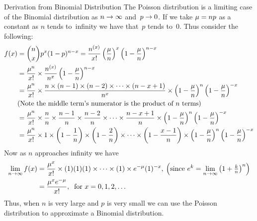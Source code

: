 \begin{theory}{Derivation from Binomial Distribution}
The Poisson distribution is a limiting case of the Binomial distribution as $n \rightarrow \infty$ and~$p \rightarrow 0$. If we take $\mu = np$ as a constant as $n$ tends to~infinity we have that~$p$ tends to~0. Thus consider the following:
\begin{align*}
    f(x) &= \binom{n}{x} p^x (1-p)^{n-x} 
          = \frac{n^{(x)}}{x!} \left(\frac{\mu}{n}\right)^x \left(1-\frac{\mu}{n}\right)^{n-x} \\
         &= \frac{\mu^n}{x!} \times \frac{n^{(x)}}{n^x} \left(1-\frac{\mu}{n}\right)^{n-x} \\
         &= \frac{\mu^n}{x!} \times \frac{n \times (n-1) \times (n-2) \times \cdots \times (n-x+1)}{n^x} \times \left(1-\frac{\mu}{n}\right)^{n}\left(1-\frac{\mu}{n}\right)^{-x} \\
         &\text{(Note the middle term's numerator is the product of $n$ terms)} \\
         &= \frac{\mu^n}{x!} \times \frac{n}{n} \times \frac{n-1}{n} \times \frac{n-2}{n} \times \cdots \times \frac{n-x+1}{n} \times \left(1-\frac{\mu}{n}\right)^{n}\left(1-\frac{\mu}{n}\right)^{-x} \\
         &= \frac{\mu^n}{x!} \times 1 \times \left(1-\frac{1}{n}\right) \times \left(1-\frac{2}{n}\right) \times \cdots \times \left(1-\frac{x-1}{n}\right) \times \left(1-\frac{\mu}{n}\right)^{n}\left(1-\frac{\mu}{n}\right)^{-x} \\
\end{align*}
Now as $n$ approaches infinity we have
\begin{align*}
    \lim_{n \rightarrow \infty} f(x) 
    &= \frac{\mu^x}{x!}\times (1)(1)(1)\times\cdots\times(1) \times e^{-\mu} (1)^{-x}
    ,\:\left(\text{since } e^k = \lim_{n \rightarrow \infty}\left(1 + \textstyle\frac{k}{n}\right)^n\right) \\
    &= \frac{\mu^x e^{-\mu}}{x!},\:\text{ for } x = 0,1,2,\ldots
\end{align*}
Thus, when $n$ is very large and $p$ is very small we can use the Poisson distribution to approximate a Binomial distribution.
\end{theory}
